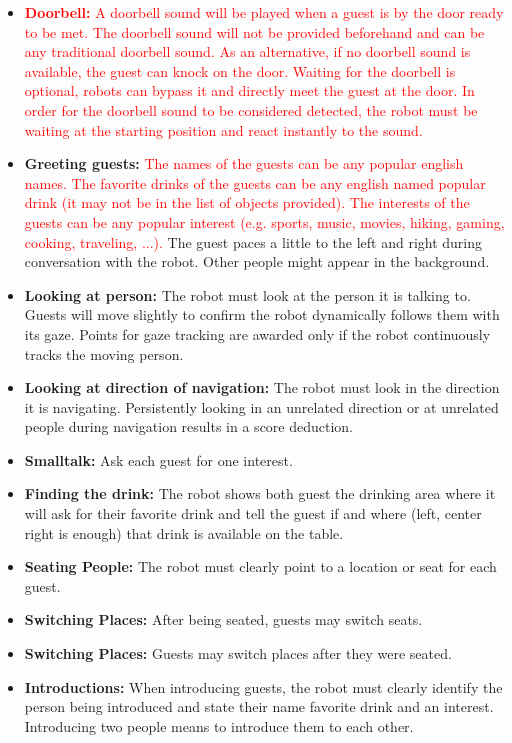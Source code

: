 \begin{itemize}

	\item \textcolor{red}{ \textbf{Doorbell:} A doorbell sound will be played when a guest is by the door ready to be met. The doorbell sound will not be provided beforehand and can be any traditional doorbell sound. As an alternative, if no doorbell sound is available, the guest can knock on the door. Waiting for the doorbell is optional, robots can bypass it and directly meet the guest at the door. In order for the doorbell sound to be considered detected, the robot must be waiting at the starting position and react instantly to the sound.} 
	
	\item \textbf{Greeting guests:} \textcolor{red}{The names of the guests can be any popular english names. The favorite drinks of the guests can be any english named popular drink (it may not be in the list of objects provided). The interests of the guests can be any popular interest (e.g. sports, music, movies, hiking, gaming, cooking, traveling, ...).}
	The guest paces a little to the left and right during conversation with the robot. Other people might appear in the background. 
	
	\item \textbf{Looking at person:} The robot must look at the person it is talking to. Guests will move slightly to confirm the robot dynamically follows them with its gaze. Points for gaze tracking are awarded only if the robot continuously tracks the moving person.
	
	\item \textbf{Looking at direction of navigation:} The robot must look in the direction it is navigating. Persistently looking in an unrelated direction or at unrelated people during navigation results in a score deduction.
    
    \item \textbf{Smalltalk:} Ask each guest for one interest.
    
    \item \textbf{Finding the drink:} The robot shows both guest the drinking area where it will ask for their favorite drink and tell the guest if and where (left, center right is enough) that drink is available on the table. 
	
	\item \textbf{Seating People:} The robot must clearly point to a location or seat for each guest.

	\item \textbf{Switching Places:} After being seated, guests may switch seats.
	
	\item \textbf{Switching Places:} Guests may switch places after they were seated.
	
	\item \textbf{Introductions:} When introducing guests, the robot must clearly identify the person being introduced and state their name favorite drink and an interest. Introducing two people means to introduce them to each other.
\end{itemize}

